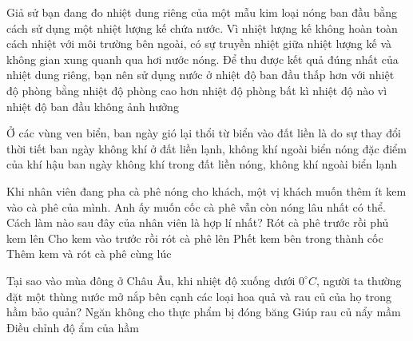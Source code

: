 \begin{ex} 
	Giả sử bạn đang đo nhiệt dung riêng của một mẫu kim loại nóng ban đầu bằng cách sử dụng một nhiệt lượng kế chứa nước. Vì nhiệt lượng kế không hoàn toàn cách nhiệt với môi trường bên ngoài, có sự truyền nhiệt giữa nhiệt lượng kế và không gian xung quanh qua hơi nước nóng. Để thu được kết quả đúng nhất của nhiệt dung riêng, bạn nên sử dụng nước ở nhiệt độ ban đầu
	\choice
	{\True thấp hơn với nhiệt độ phòng}
	{bằng nhiệt độ phòng}
	{cao hơn nhiệt độ phòng}
	{bất kì nhiệt độ nào vì nhiệt độ ban đầu không ảnh hưởng}
\end{ex}



\begin{ex}
	Ở các vùng ven biển, ban ngày gió lại thổi từ biển vào đất liền là do
	\choice
	{sự thay đổi thời tiết}
	{ban ngày không khí ở đất liền lạnh, không khí ngoài biển nóng}
	{đặc điểm của khí hậu}
	{\True ban ngày không khí trong đất liền nóng, không khí ngoài biển lạnh}
\end{ex}
\begin{ex} 
	Khi nhân viên đang pha cà phê nóng cho khách, một vị khách muốn thêm ít kem vào cà phê của mình. Anh ấy muốn cốc cà phê vẫn còn nóng lâu nhất có thể. Cách làm nào sau đây của nhân viên là hợp lí nhất?
	\choice 
	{\True Rót cà phê trước rồi phủ kem lên}
	{Cho kem vào trước rồi rót cà phê lên}
	{Phết kem bên trong thành cốc}
	{Thêm kem và rót cà phê cùng lúc}
\end{ex}
\begin{ex} 
	Tại sao vào mùa đông ở Châu Âu, khi nhiệt độ xuống dưới $0^\circ C$, người ta thường đặt một thùng nước mở nắp bên cạnh các loại hoa quả và rau củ của họ trong hầm bảo quản?
	{\True Ngăn không cho thực phẩm bị đóng băng}
	{Giúp rau củ nẩy mầm}
	{\True Điều chỉnh độ ẩm của hầm}
\end{ex}

